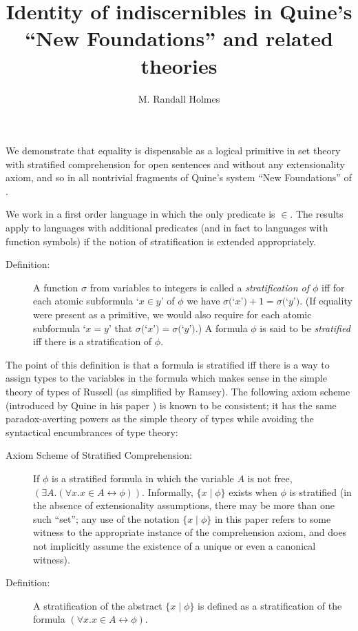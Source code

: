 \documentclass{article}
\title{Identity of indiscernibles in Quine's ``New Foundations'' and related theories}
\author{M. Randall Holmes}
\begin{document}
\maketitle

We demonstrate that equality is dispensable as a logical primitive in
set theory with stratified comprehension for open sentences and
without any extensionality axiom, and so in all nontrivial fragments
of Quine's system ``New Foundations'' of \cite{nf}.

We work in a first order language in which the only predicate is
$\in$.  The results apply to languages with additional predicates (and
in fact to languages with function symbols) if the notion of
stratification is extended appropriately.

\begin{description}

\item[Definition:]  A function $\sigma$ from variables to integers is called a {\em
stratification of $\phi$\/} iff for each atomic subformula `$x \in y$'
of $\phi$ we have $\sigma($`$x$'$)+1 = \sigma($`$y$'$)$.  (If equality
were present as a primitive, we would also require for each atomic
subformula `$x = y$' that $\sigma($`$x$'$) = \sigma($`$y$'$)$.) A
formula $\phi$ is said to be {\em stratified\/} iff there is a
stratification of $\phi$.

\end{description}

The point of this definition is that a formula is stratified iff there
is a way to assign types to the variables in the formula which makes
sense in the simple theory of types of Russell (as simplified by
Ramsey).  The following axiom scheme (introduced by Quine in his paper
\cite{nf}) is known to be consistent; it has the same paradox-averting
powers as the simple theory of types while avoiding the syntactical
encumbrances of type theory:

\begin{description}

\item[Axiom Scheme of Stratified Comprehension:]  
If $\phi$ is a stratified formula in which the variable $A$ is not
free, $(\exists A.(\forall x.x \in A \leftrightarrow \phi))$.
Informally, $\{x \mid \phi\}$ exists when $\phi$ is stratified (in the
absence of extensionality assumptions, there may be more than one such
``set''; any use of the notation $\{x \mid \phi\}$ in this paper
refers to some witness to the appropriate instance of the
comprehension axiom, and does not implicitly assume the existence of a
unique or even a canonical witness).

\item[Definition:]  A stratification of the abstract $\{x \mid \phi\}$ is defined as a stratification of the formula $(\forall x.x \in A \leftrightarrow \phi)$.

\end{description}
\end{document}
